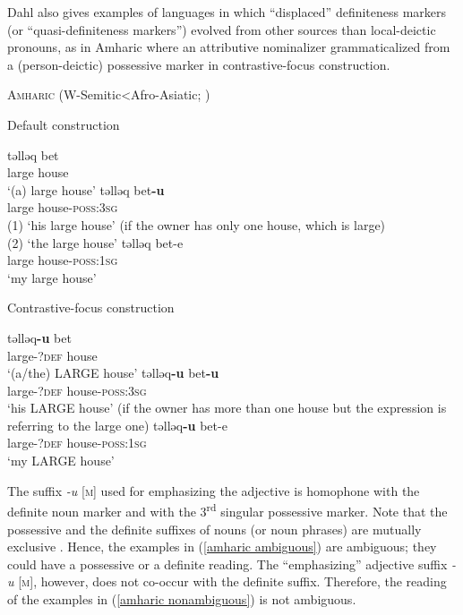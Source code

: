 {Dahl also gives examples of languages in which “displaced” definiteness markers (or “quasi-definiteness markers”) evolved from other sources than local-deictic pronouns, as in Amharic where an attributive nominalizer grammaticalized from a (person-deictic) possessive marker in contrastive-focus construction.
\begin{exe}
\ex	\textsc{Amharic} (W-Semitic<Afro-Asiatic; \citealt{hudson1997})
\begin{xlist}
\ex	Default construction
\begin{xlist}
\ex
\gll	təlləq bet\\
	large	house\\								
\glt	‘(a) large house’
\ex	\label{amharic ambiguous}
\gll	təlləq bet\textbf{-u}\\
	large house-\textsc{poss:3sg}\\
\glt	(1) ‘his large house’ (if the owner has only one house, which is large)\\
	(2) ‘the large house’
\ex
\gll	təlləq bet-e\\
	large house-\textsc{poss:1sg}\\
\glt	‘my large house’
\end{xlist}
\ex	Contrastive-focus construction
\begin{xlist}
\ex	
\gll	təlləq\textbf{-u} bet\\
	large-\textsc{?def} house\\
\glt	‘(a/the) LARGE house’
\ex	\label{amharic nonambiguous}
\gll	təlləq\textbf{-u} bet\textbf{-u}\\
	large-\textsc{?def} house-\textsc{poss:3sg}\\
\glt	‘his LARGE house’ (if the owner has more than one house but the expression is referring to the large one)
\ex
\gll	təlləq\textbf{-u} bet-e\\
	large-\textsc{?def} house-\textsc{poss:1sg}\\
\glt	‘my LARGE house’
\end{xlist}
\end{xlist}
\end{exe}
The suffix \textit{-u} [\textsc{m}] used for emphasizing the adjective is homophone with the definite noun marker and with the 3\textsuperscript{rd} singular possessive marker. Note that the possessive and the definite suffixes of nouns (or noun phrases) are mutually exclusive \citep[463]{hudson1997}. Hence, the examples in (\ref{amharic ambiguous}) are ambiguous; they could have a possessive or a definite reading. The “emphasizing” adjective suffix \textit{-u} [\textsc{m}], however, does not co-occur with the definite suffix. Therefore, the reading of the examples in (\ref{amharic nonambiguous}) is not ambiguous.

}
